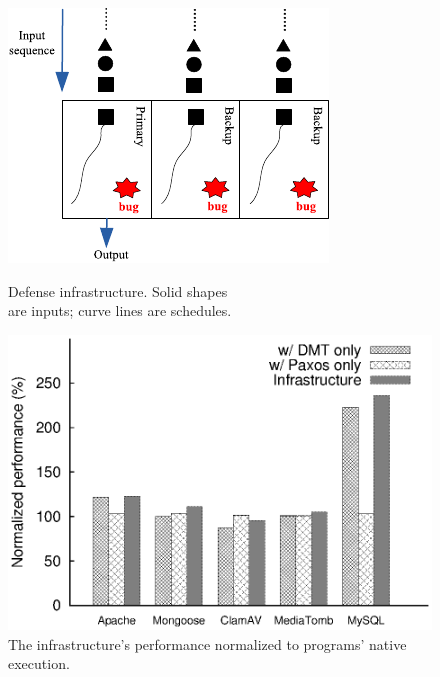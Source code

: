 \begin{figure}[!htb]
    \centering
    \begin{minipage}{0.5\textwidth}
       \hspace{.25in}
      \includegraphics[width=0.25\textheight]{figures/defense}
       \vspace{-.02in}
      \caption{{Defense infrastructure. Solid shapes \\
      are inputs; curve lines are schedules.}} 
      \label{fig:defense}
    \end{minipage}%
    \begin{minipage}{0.5\textwidth}
       \vspace{-.3in}
      \includegraphics[width=0.35\textheight]{figures/normalize-perf.eps}
      \vspace{-.15in}
      \caption{{The infrastructure's performance normalized to 
programs' native execution.}}
      \label{fig:normalize-perf}
    \end{minipage}
      \vspace{-.2in}
\end{figure}



